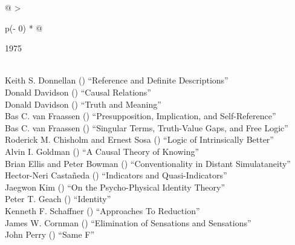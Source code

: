 \documentclass[
  10pt,
  letterpaper,
  DIV=11,
  numbers=noendperiod,
  twoside]{scrartcl}
\begin{document}
\begin{longtable}[]{@{}
  >{\raggedright\arraybackslash}p{(\columnwidth - 0\tabcolsep) * }@{}}

\caption{\label{tbl-top-ten-1966}Most cited articles published less than
ten years ago as of 1975.}

\tabularnewline

\toprule\noalign{}
\begin{minipage}[b]{\linewidth}\raggedright
1975
\end{minipage} \\
\midrule\noalign{}
\endhead
\bottomrule\noalign{}
\endlastfoot
Keith S. Donnellan
()
``Reference and Definite Descriptions'' \\
Donald Davidson
()
``Causal Relations'' \\
Donald Davidson
()
``Truth and Meaning'' \\
Bas C. van Fraassen
()
``Presupposition, Implication, and Self-Reference'' \\
Bas C. van Fraassen
()
``Singular Terms, Truth-Value Gaps, and Free Logic'' \\
Roderick M. Chisholm and Ernest Sosa
()
``Logic of Intrinsically Better'' \\
Alvin I. Goldman
()
``A Causal Theory of Knowing'' \\
Brian Ellis and Peter Bowman
()
``Conventionality in Distant Simulataneity'' \\
Hector-Neri Castañeda
()
``Indicators and Quasi-Indicators'' \\
Jaegwon Kim
()
``On the Psycho-Physical Identity Theory'' \\
Peter T. Geach
()
``Identity'' \\
Kenneth F. Schaffner
()
``Approaches To Reduction'' \\
James W. Cornman
()
``Elimination of Sensations and Sensations'' \\
John Perry
()
``Same F'' \\

\end{longtable}
\end{document}
